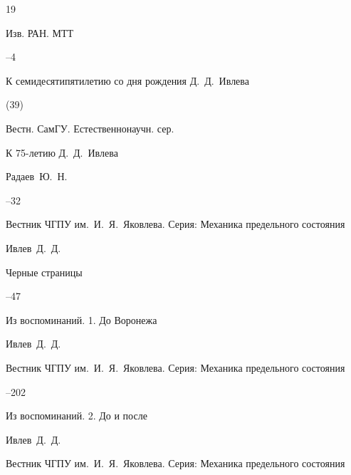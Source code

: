 \RusRef



\begin{thebibliography}{19}






\jour Изв. РАН. МТТ

--4

\paper К семидесятипятилетию со дня рождения Д.~Д.~Ивлева





(39)

\jour Вестн. СамГУ. Естественнонаучн. сер.

\paper К 75-летию Д.~Д.~Ивлева

\by Радаев~Ю.~Н. 

--32





\jour Вестник \mbox{ЧГПУ} им.~И.~Я.~Яковлева. Серия: Механика предельного состояния



\by Ивлев~Д.~Д.

\paper Черные страницы

--47




\paper Из воспоминаний. 1. До Воронежа

\by Ивлев~Д.~Д.

\jour Вестник \mbox{ЧГПУ} им.~И.~Я.~Яковлева. Серия: Механика предельного состояния



--202





\paper Из воспоминаний. 2. До и после

\by Ивлев~Д.~Д.

\jour Вестник \mbox{ЧГПУ} им.~И.~Я.~Яковлева. Серия: Механика предельного состояния


\end{thebibliography}
